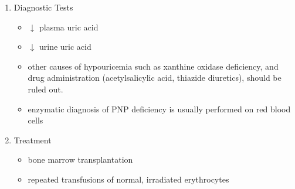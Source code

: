 \documentclass{scrartcl}
\begin{document}
\begin{enumerate}
\item Diagnostic Tests
\label{sec:org8f00933}
\begin{itemize}
\item \(\downarrow\) plasma uric acid
\item \(\downarrow\) urine uric acid

\item other causes of hypouricemia such as xanthine oxidase deficiency,
and drug administration (acetylsalicylic acid, thiazide diuretics),
should be ruled out.
\item enzymatic diagnosis of PNP deficiency is usually performed on red
blood cells
\end{itemize}

\item Treatment
\label{sec:org427735c}
\begin{itemize}
\item bone marrow transplantation
\item repeated transfusions of normal, irradiated erythrocytes
\end{itemize}
\end{enumerate}
\end{document}
